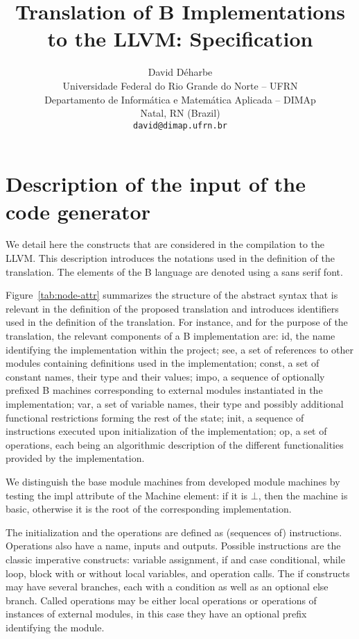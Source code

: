 \documentclass{article}
\title{Translation of B Implementations to the LLVM: Specification}
\author{David Déharbe \\
  Universidade Federal do Rio Grande do Norte -- UFRN \\
  Departamento de Informática e Matemática Aplicada -- DIMAp \\
 Natal, RN (Brazil) \\
\texttt{david@dimap.ufrn.br}}
\newcommand{\B}[1]{\textsf{#1}}
\begin{document}
\maketitle

\pagebreak
\tableofcontents

\pagebreak
\section{Description of the input of the code generator}
\label{sec:b-ast}

We detail here the constructs that are considered in the compilation to the
LLVM. This description introduces the notations used in the definition of the
translation. The elements of the B language are denoted using a \B{sans serif}
font.

Figure~\ref{tab:node-attr} summarizes the structure
of the abstract syntax that is relevant in the definition of the proposed
translation and introduces identifiers used in the definition of the
translation. For instance, and for the purpose of the translation, the relevant
components of a B implementation are: \B{id}, the name identifying the
implementation within the project; \B{see}, a set of references to other modules
containing definitions used in the implementation; \B{const}, a set of constant
names, their type and their values; \B{impo}, a sequence of optionally
prefixed B machines corresponding to external modules instantiated in the
implementation; \B{var}, a set of variable names, their type and possibly
additional functional restrictions forming the rest of the state; \B{init}, a
sequence of instructions executed upon initialization of the implementation;
\B{op}, a set of operations, each being an algorithmic description of the
different functionalities provided by the implementation.

We distinguish the base module machines from developed module machines by
testing the \B{impl} attribute of the \B{Machine} element: if it is $\bot$, then
the machine is basic, otherwise it is the root of the corresponding
implementation.

The initialization and the operations are defined as (sequences of)
instructions. Operations also have a name, inputs and outputs. Possible
instructions are the classic imperative constructs: variable assignment, if and
case conditional, while loop, block with or without local variables, and
operation calls. The if constructs may have several branches, each with a
condition as well as an optional else branch. Called operations may be either
local operations or operations of instances of external modules, in this case
they have an optional prefix identifying the module.
\end{document}

